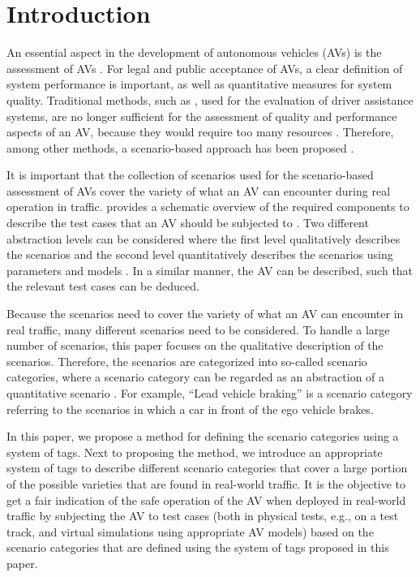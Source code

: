 \section{Introduction}
\label{sec:introduction}

An essential aspect in the development of autonomous vehicles (AVs) is the assessment of AVs \autocite{bengler2014threedecades, stellet2015taxonomy, Helmer2017safety, putz2017pegasus, roesener2017comprehensive, gietelink2006development, wachenfeld2016release}.
For legal and public acceptance of AVs, a clear definition of system performance is important, as well as quantitative measures for system quality. 
Traditional methods, such as \autocite{response2006code, ISO26262}, used for the evaluation of driver assistance systems, are no longer sufficient for the assessment of quality and performance aspects of an AV, because they would require too many resources \autocite{wachenfeld2016release}. 
Therefore, among other methods, a scenario-based approach has been proposed \autocite{elrofai2018scenario, putz2017pegasus}. 

It is important that the collection of scenarios used for the scenario-based assessment of AVs cover the variety of what an AV can encounter during real operation in traffic. 
 provides a schematic overview of the required components to describe the test cases that an AV should be subjected to \autocite{elrofai2018scenario}. 
Two different abstraction levels can be considered where the first level qualitatively describes the scenarios and the second level quantitatively describes the scenarios using parameters and models \autocite{degelder2020ontology}. In a similar manner, the AV can be described, such that the relevant test cases can be deduced. 

Because the scenarios need to cover the variety of what an AV can encounter in real traffic, many different scenarios need to be considered. To handle a large number of scenarios, this paper focuses on the qualitative description of the scenarios. Therefore, the scenarios are categorized into so-called scenario categories, where a scenario category can be regarded as an abstraction of a quantitative scenario \autocite{degelder2020ontology}. For example, ``Lead vehicle braking'' is a scenario category referring to the scenarios in which a car in front of the ego vehicle brakes. 

In this paper, we propose a method for defining the scenario categories using a system of tags. Next to proposing the method, we introduce an appropriate system of tags to describe different scenario categories that cover a large portion of the possible varieties that are found in real-world traffic.
It is the objective to get a fair indication of the safe operation of the AV when deployed in real-world traffic by subjecting the AV to test cases (both in physical tests, e.g., on a test track, and virtual simulations using appropriate AV models) based on the scenario categories that are defined using the system of tags proposed in this paper.

